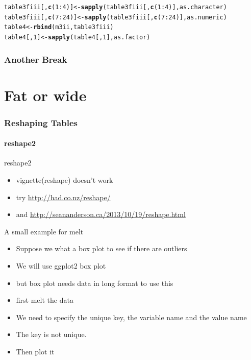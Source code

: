 \documentclass[10pt,handout,english]{beamer}\usepackage[]{graphicx}\usepackage[]{color}
\makeatletter
\newcommand{\hlnum}[1]{\textcolor[rgb]{0.686,0.059,0.569}{#1}}%
\newcommand{\hlopt}[1]{\textcolor[rgb]{0,0,0}{#1}}%
\newcommand{\hlstd}[1]{\textcolor[rgb]{0.345,0.345,0.345}{#1}}%
\newcommand{\hlkwb}[1]{\textcolor[rgb]{0.69,0.353,0.396}{#1}}%
\newcommand{\hlkwd}[1]{\textcolor[rgb]{0.737,0.353,0.396}{\textbf{#1}}}%
\newenvironment{kframe}{%
 \def\at@end@of@kframe{}%
 \ifinner\ifhmode%
  \def\at@end@of@kframe{\end{minipage}}%
  \begin{minipage}{\columnwidth}%
 \fi\fi%
 \def\FrameCommand##1{\hskip\@totalleftmargin \hskip-\fboxsep
 \colorbox{shadecolor}{##1}\hskip-\fboxsep
     \hskip-\linewidth \hskip-\@totalleftmargin \hskip\columnwidth}%
 \MakeFramed {\advance\hsize-\width
   \@totalleftmargin\z@ \linewidth\hsize
   \@setminipage}}%
 {\par\unskip\endMakeFramed%
 \at@end@of@kframe}
\newenvironment{knitrout}{}{} %
\makeatother
\begin{document}
\begin{frame}[fragile]
\begin{knitrout}
\begin{kframe}
\begin{alltt}
\hlstd{table3fiii[,}\hlkwd{c}\hlstd{(}\hlnum{1}\hlopt{:}\hlnum{4}\hlstd{)]} \hlkwb{<-} \hlkwd{sapply}\hlstd{(table3fiii[,}\hlkwd{c}\hlstd{(}\hlnum{1}\hlopt{:}\hlnum{4}\hlstd{)],as.character)}
\hlstd{table3fiii[,}\hlkwd{c}\hlstd{(}\hlnum{7}\hlopt{:}\hlnum{24}\hlstd{)]} \hlkwb{<-} \hlkwd{sapply}\hlstd{(table3fiii[,}\hlkwd{c}\hlstd{(}\hlnum{7}\hlopt{:}\hlnum{24}\hlstd{)],as.numeric)}
\hlstd{table4}\hlkwb{<-}\hlkwd{rbind}\hlstd{(m3ii,table3fiii)}
\hlstd{table4[,}\hlnum{1}\hlstd{]} \hlkwb{<-} \hlkwd{sapply}\hlstd{(table4[,}\hlnum{1}\hlstd{],as.factor)}
\end{alltt}
\end{kframe}
\end{knitrout}
\end{frame}

\begin{frame}
  \frametitle{Another Break}
\end{frame}


\section*{Fat or wide}
\begin{frame}[fragile]
  \frametitle{Reshaping Tables}
  \framesubtitle{reshape2}
  \begin{block}{reshape2}
  \begin{itemize}
 \item vignette(reshape) doesn't work
 \item try \url{http://had.co.nz/reshape/}
  \item and \url{http://seananderson.ca/2013/10/19/reshape.html}
  \end{itemize}
  \end{block}
  \begin{block}{A small example for melt}
  \begin{itemize}
  \item Suppose we what a box plot to see if there are outliers
  \item We will use ggplot2 box plot
  \item but box plot needs data in long format to use this
  \item first melt the data
  \item We need to specify the unique key, the variable name and the value name
  \item The key is not unique.
  \item Then plot it
  \end{itemize}
  \end{block}
\end{frame}  
  
\end{document}
